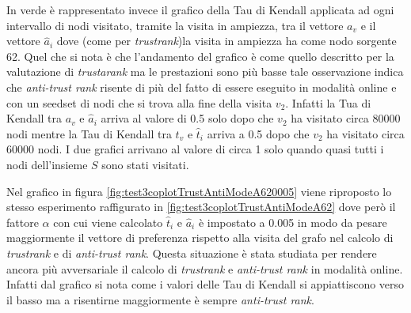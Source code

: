 In verde è rappresentato invece il grafico della Tau di Kendall applicata ad ogni intervallo di nodi visitato, tramite la visita in ampiezza, tra il vettore \(a_v\) e il vettore \(\hat{a}_i\) dove (come per \textit{trustrank})la visita in ampiezza ha come nodo sorgente 62. Quel che si nota è che l'andamento del grafico è come quello descritto per la valutazione di \textit{trustarank} ma le prestazioni sono più basse tale osservazione indica che \textit{anti-trust rank} risente di più del fatto di essere eseguito in modalità online e con un seedset di nodi che si trova alla fine della visita \(v_2\). Infatti la Tua di Kendall tra \(a_v\) e \(\hat{a}_i\) arriva al valore di 0.5 solo dopo che \(v_2\) ha visitato circa 80000 nodi mentre la Tau di Kendall tra \(t_v\) e \(\hat{t}_i\) arriva a 0.5 dopo che \(v_2\) ha visitato circa 60000 nodi. I due grafici arrivano al valore di circa 1 solo quando quasi tutti i nodi dell'insieme \(S\) sono stati visitati.

Nel grafico in figura \ref{fig:test3coplotTrustAntiModeA620005} viene riproposto lo stesso esperimento raffigurato in \ref{fig:test3coplotTrustAntiModeA62} dove però il fattore \(\alpha\) con cui viene calcolato \(\hat{t}_i\) e \(\hat{a}_i\) è impostato a 0.005 in modo da pesare maggiormente il vettore di preferenza   rispetto alla visita del grafo nel calcolo di \textit{trustrank} e di \textit{anti-trust rank}. Questa situazione è stata studiata per rendere ancora più avversariale il calcolo di \textit{trustrank} e \textit{anti-trust rank} in modalità online. Infatti dal grafico si nota come i valori delle Tau di Kendall si appiattiscono verso il basso ma a risentirne maggiormente è sempre \textit{anti-trust rank}.


